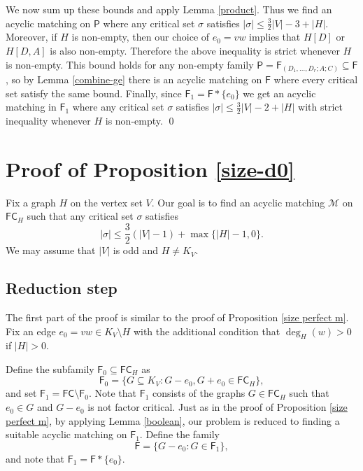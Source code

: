 \documentclass[10pt]{amsart}
\theoremstyle{definition}
\begin{document}
	
	We now sum up these bounds and apply Lemma \ref{product}.  Thus we find an acyclic matching on $\mathsf{P}$ where any critical set $\sigma$ satisfies
	$|\sigma|\leq \textstyle{\frac{3}{2}}|V|-3 +|H|$. 	Moreover, if $H$ is non-empty, then our choice of $e_0=vw$ implies that $H[D]$ or $H[D,A]$ is also non-empty. Therefore the above inequality is strict whenever $H$ is non-empty.  This bound holds for any non-empty family $\mathsf{P} = \mathsf{F}_{(D_1, \dots, D_r; A; C)} \subseteq \mathsf{F}$, so by Lemma \ref{combine-ge} there is an acyclic matching on $\mathsf{F}$ where every critical set satisfy the same bound. Finally, since $\mathsf{F}_1 = \mathsf{F} * \{e_0\}$ we get an acyclic matching in $\mathsf{F}_1$ where any critical set $\sigma$ satisfies $|\sigma|\leq \frac{3}{2}|V|-2+|H|$ with strict inequality whenever $H$ is non-empty.
	\qed	
	
	
	
	\section{Proof of Proposition \ref{size-d0}} \label{section_size-d0}
	
	Fix a graph $H$ on the vertex set $V$.
	Our goal is to find an acyclic matching $\mathcal{M}$ on $\mathsf{FC}_H$ such that any critical set $\sigma$ satisfies 
	\[|\sigma|\leq \textstyle{\frac{3}{2}}(|V|-1)+\max\{ |H|-1 , 0\}.\]
	We may assume that  $|V|$ is odd and $H\neq K_V$.
	
	
	\subsection*{Reduction step}
	The first part of the proof is similar to the proof of Proposition \ref{size perfect m}. Fix an edge $e_0 = vw \in K_V\setminus H$ with the additional condition that $\deg_H(w)>0$ if $|H|>0$. 
	
	Define the subfamily $\mathsf{F}_0\subseteq \mathsf{FC}_H$ as 
	\[\mathsf{F}_0 = \{ G\subseteq K_V : G-e_0, G+e_0\in \mathsf{FC}_H\},\]
	and set $\mathsf{F}_1 = \mathsf{FC} \setminus \mathsf{F}_0$. 
	Note that $\mathsf{F}_1$ consists of the graphs $G\in \mathsf{FC}_H$ such that $e_0\in G$ and  $G-e_0$ is not factor critical.
	Just as in the proof of Proposition \ref{size perfect m}, by applying Lemma \ref{boolean}, our problem is reduced to finding a suitable acyclic matching on $\mathsf{F}_1$. Define the family \[\mathsf{F} = \{G-e_0 : G\in \mathsf{F}_1\},\] and note that $\mathsf{F}_1 = \mathsf{F} * \{e_0\}$. 
	
\end{document}

